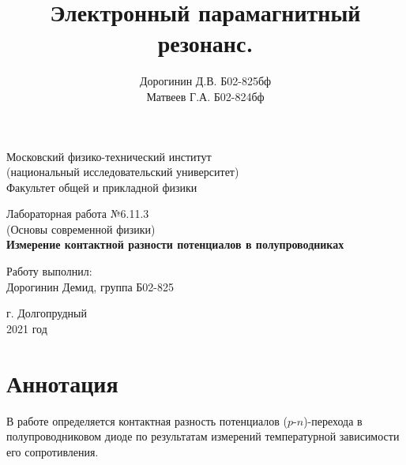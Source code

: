 \documentclass[a4paper,12pt]{article}
\date{\vspace{-10pt}}
\author{Дорогинин Д.В. Б02-825бф\\
Матвеев Г.А. Б02-824бф}
\title{\textbf{Электронный парамагнитный резонанс.}}
\theoremstyle{definition}
\begin{document}
\begin{titlepage}
	\begin{center}
		\large 	Московский физико-технический институт \\
		(национальный исследовательский университет) \\
		Факультет общей и прикладной физики \\
		\vspace{0.2cm}
		
		\vspace{4.5cm}
		Лабораторная работа №6.11.3  \\ \vspace{0.2cm}
		\large (Основы современной физики) \\ \vspace{0.2cm}
		\LARGE \textbf{ Измерение контактной разности потенциалов в полупроводниках }
	\end{center}
	\vspace{2.3cm} \large
	
	\begin{center}
		Работу выполнил: \\
		Дорогинин Демид,
		группа Б02-825
		\vspace{10mm}			
	\end{center}
		
	\begin{center} \vspace{60mm}
		г. Долгопрудный \\
		2021 год
	\end{center}
\end{titlepage}


\section*{Аннотация}
В работе определяется контактная разность потенциалов ($p$-$n$)-перехода в полупроводниковом диоде по результатам измерений температурной зависимости его сопротивления.
\end{document}
